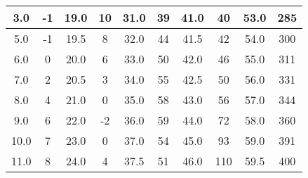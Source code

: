 \begin{table*}
\begin{ruledtabular}
\begin{tabular}{|cccccccccc|}
        \multicolumn{1}{|c|}{3.0}       & \multicolumn{1}{c|}{-1}         & \multicolumn{1}{c|}{19.0}      & \multicolumn{1}{c|}{10}         & \multicolumn{1}{c|}{31.0}      & \multicolumn{1}{c|}{39}         & \multicolumn{1}{c|}{41.0}      & \multicolumn{1}{c|}{40}         & \multicolumn{1}{c|}{53.0}      & 285        \\ \hline
        \multicolumn{1}{|c|}{5.0}       & \multicolumn{1}{c|}{-1}         & \multicolumn{1}{c|}{19.5}      & \multicolumn{1}{c|}{8}          & \multicolumn{1}{c|}{32.0}      & \multicolumn{1}{c|}{44}         & \multicolumn{1}{c|}{41.5}      & \multicolumn{1}{c|}{42}         & \multicolumn{1}{c|}{54.0}      & 300        \\ \hline
        \multicolumn{1}{|c|}{6.0}       & \multicolumn{1}{c|}{0}          & \multicolumn{1}{c|}{20.0}      & \multicolumn{1}{c|}{6}          & \multicolumn{1}{c|}{33.0}      & \multicolumn{1}{c|}{50}         & \multicolumn{1}{c|}{42.0}      & \multicolumn{1}{c|}{46}         & \multicolumn{1}{c|}{55.0}      & 311        \\ \hline
        \multicolumn{1}{|c|}{7.0}       & \multicolumn{1}{c|}{2}          & \multicolumn{1}{c|}{20.5}      & \multicolumn{1}{c|}{3}          & \multicolumn{1}{c|}{34.0}      & \multicolumn{1}{c|}{55}         & \multicolumn{1}{c|}{42.5}      & \multicolumn{1}{c|}{50}         & \multicolumn{1}{c|}{56.0}      & 331        \\ \hline
        \multicolumn{1}{|c|}{8.0}       & \multicolumn{1}{c|}{4}          & \multicolumn{1}{c|}{21.0}      & \multicolumn{1}{c|}{0}          & \multicolumn{1}{c|}{35.0}      & \multicolumn{1}{c|}{58}         & \multicolumn{1}{c|}{43.0}      & \multicolumn{1}{c|}{56}         & \multicolumn{1}{c|}{57.0}      & 344        \\ \hline
        \multicolumn{1}{|c|}{9.0}       & \multicolumn{1}{c|}{6}          & \multicolumn{1}{c|}{22.0}      & \multicolumn{1}{c|}{-2}         & \multicolumn{1}{c|}{36.0}      & \multicolumn{1}{c|}{59}         & \multicolumn{1}{c|}{44.0}      & \multicolumn{1}{c|}{72}         & \multicolumn{1}{c|}{58.0}      & 360        \\ \hline
        \multicolumn{1}{|c|}{10.0}      & \multicolumn{1}{c|}{7}          & \multicolumn{1}{c|}{23.0}      & \multicolumn{1}{c|}{0}          & \multicolumn{1}{c|}{37.0}      & \multicolumn{1}{c|}{54}         & \multicolumn{1}{c|}{45.0}      & \multicolumn{1}{c|}{93}         & \multicolumn{1}{c|}{59.0}      & 391        \\ \hline
        \multicolumn{1}{|c|}{11.0}      & \multicolumn{1}{c|}{8}          & \multicolumn{1}{c|}{24.0}      & \multicolumn{1}{c|}{4}          & \multicolumn{1}{c|}{37.5}      & \multicolumn{1}{c|}{51}         & \multicolumn{1}{c|}{46.0}      & \multicolumn{1}{c|}{110}        & \multicolumn{1}{c|}{59.5}      & 400        \\ \hline

\end{tabular}
\end{ruledtabular}
\end{table*}
